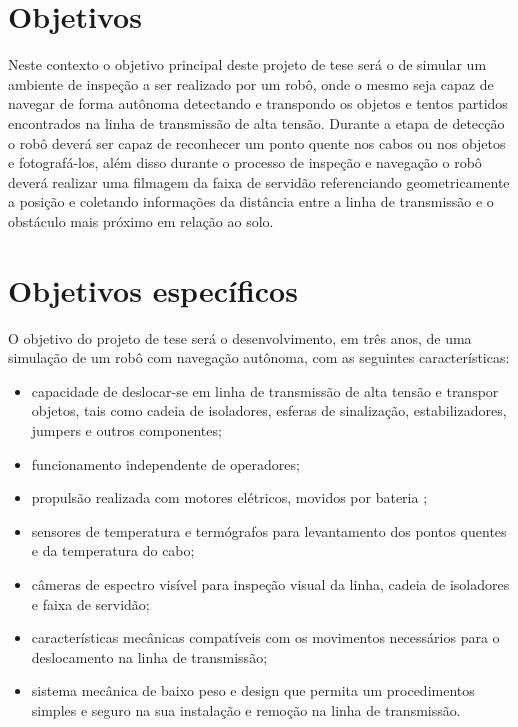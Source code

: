 \section{Objetivos}
Neste contexto o objetivo principal deste projeto de tese será o de simular um ambiente de inspeção a ser realizado por um robô, onde o mesmo seja capaz de navegar de forma autônoma detectando e transpondo os objetos e tentos partidos encontrados na linha de transmissão de alta tensão. Durante a etapa de detecção o robô deverá ser capaz de reconhecer um ponto quente nos cabos ou nos objetos e fotografá-los, além disso durante o processo de inspeção e navegação o robô deverá realizar uma filmagem da faixa de servidão referenciando geometricamente a posição e coletando informações da distância entre a linha de transmissão e o obstáculo mais próximo em relação ao solo.

\section{Objetivos específicos}
O objetivo do projeto de tese será o desenvolvimento, em três anos, de uma simulação de um robô com navegação autônoma, com as seguintes características:
\begin{itemize}
\item capacidade de deslocar-se em linha de transmissão de alta tensão e transpor objetos, tais como cadeia de isoladores, esferas de sinalização, estabilizadores, jumpers e outros componentes;
\item funcionamento independente de operadores;
\item propulsão realizada com motores elétricos, movidos por bateria	;
\item sensores de temperatura e termógrafos para levantamento dos pontos quentes e da temperatura do cabo;
\item câmeras de espectro visível para inspeção visual da linha, cadeia de isoladores e faixa de servidão;
\item características mecânicas compatíveis com os movimentos necessários para o deslocamento na linha de transmissão;
\item sistema mecânica de baixo peso e design que permita um procedimentos simples e seguro na sua instalação e remoção na linha de transmissão.
\end{itemize}

